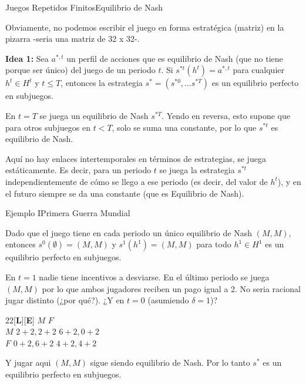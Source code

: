 \documentclass[notes, 11pt]{beamer} %
\newenvironment{wideitemize}{\itemize\addtolength{\itemsep}{10pt}}{\enditemize}
\begin{document}
\begin{frame}{Juegos Repetidos Finitos}{Equilibrio de Nash}
	\begin{wideitemize}
		\item<1-> Obviamente, no podemos escribir el juego en forma estrat\'egica (matriz) en la pizarra -seria una matriz de 32 x 32-.
		\item<2-> \textbf{Idea 1:} Sea $a^{*,t}$ un perfil de acciones que es equilibrio de Nash (que no tiene porque ser \'unico) del juego de un periodo $t$. Si $s^{*t}(h^{t}) = a^{*,t}$ para cualquier $h^{t} \in H^{t}$ y $t\leq T$, entonces la estrategia $s^{*} = (s^{*0}, \dots s^{*T})$ es un equilibrio perfecto en subjuegos.
		\begin{wideitemize}
			\item<3->[--] En $t=T$ se juega un equilibrio de Nash $s^{*T}$. Yendo en reversa, esto supone que para otros subjuegos en $t<T$, solo se suma una constante, por lo que $s^{*t}$ es equilibrio de Nash.
			\item<4->[--] Aqu\'i no hay enlaces intertemporales en t\'erminos de estrategias, se juega est\'aticamente. Es decir, para un periodo $t$ se juega la estrategia $s^{*t}$ independientemente de c\'omo se llego a ese periodo (es decir, del valor de $h^{t}$), y en el futuro siempre se da una constante (que es Equilibrio de Nash).
		\end{wideitemize}
	\end{wideitemize}
\end{frame}

\begin{frame}{Ejemplo I}{Primera Guerra Mundial}
	\begin{wideitemize}
		\item<1-> Dado que el juego tiene en cada periodo un \'unico equilibrio de Nash $(M,M)$, entonces $s^{0}(\emptyset) = (M,M)$ y $s^{1}(h^{1}) = (M,M)$ para todo $h^{1} \in H^{1}$ es un equilibrio perfecto en subjuegos. 
		\item<2-> En $t=1$ nadie tiene incentivos a desviarse. En el \'ultimo periodo se juega $(M,M)$ por lo que ambos jugadores reciben un pago igual a 2. No seria racional jugar distinto (¿por qu\'e?). ¿Y en $t=0$ (asumiendo $\delta=1$)?
		\begin{center}
			 \begin{game}{2}{2}[\textbf{L}][\textbf{E}]
                  \>$M$         \>$F$\\
        $M$       \>$2+2,2+2$       \>$6+2,0+2$\\
        $F$       \>$0+2,6+2$       \>$4+2,4+2$
        	 \end{game}
        \end{center}
        \item<3-> Y jugar aqui $(M,M)$ sigue siendo equilibrio de Nash. Por lo tanto $s^{*}$ es un equilibrio perfecto en subjuegos.
	\end{wideitemize}
\end{frame}
\end{document}
